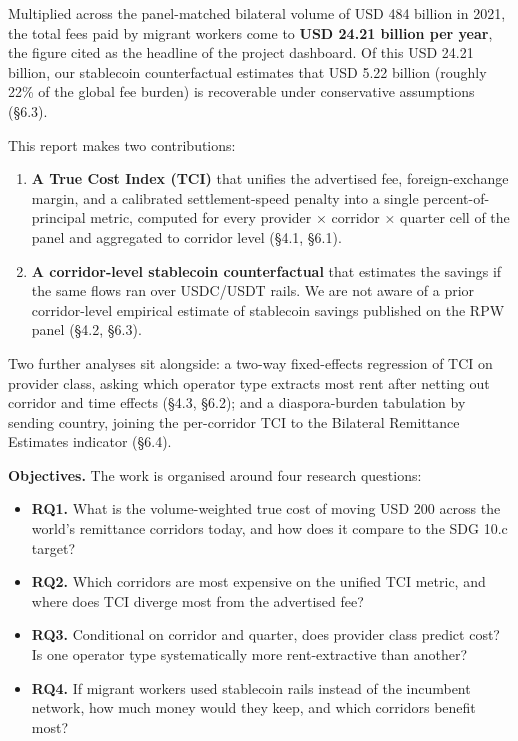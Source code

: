 \documentclass[
  11pt,
]{article}
\providecommand{\tightlist}{%
  \setlength{\itemsep}{0pt}\setlength{\parskip}{0pt}}
\begin{document}
Multiplied across the panel-matched bilateral volume of USD 484 billion
in 2021, the total fees paid by migrant workers come to \textbf{USD
24.21 billion per year}, the figure cited as the headline of the project
dashboard. Of this USD 24.21 billion, our stablecoin counterfactual
estimates that USD 5.22 billion (roughly 22\% of the global fee burden)
is recoverable under conservative assumptions (§6.3).

This report makes two contributions:

\begin{enumerate}
\def\labelenumi{\arabic{enumi}.}
\item
  \textbf{A True Cost Index (TCI)} that unifies the advertised fee,
  foreign-exchange margin, and a calibrated settlement-speed penalty
  into a single percent-of-principal metric, computed for every provider
  × corridor × quarter cell of the panel and aggregated to corridor
  level (§4.1, §6.1).
\item
  \textbf{A corridor-level stablecoin counterfactual} that estimates the
  savings if the same flows ran over USDC/USDT rails. We are not aware
  of a prior corridor-level empirical estimate of stablecoin savings
  published on the RPW panel (§4.2, §6.3).
\end{enumerate}

Two further analyses sit alongside: a two-way fixed-effects regression
of TCI on provider class, asking which operator type extracts most rent
after netting out corridor and time effects (§4.3, §6.2); and a
diaspora-burden tabulation by sending country, joining the per-corridor
TCI to the Bilateral Remittance Estimates indicator (§6.4).

\textbf{Objectives.} The work is organised around four research
questions:

\begin{itemize}
\tightlist
\item
  \textbf{RQ1.} What is the volume-weighted true cost of moving USD 200
  across the world's remittance corridors today, and how does it compare
  to the SDG 10.c target?
\item
  \textbf{RQ2.} Which corridors are most expensive on the unified TCI
  metric, and where does TCI diverge most from the advertised fee?
\item
  \textbf{RQ3.} Conditional on corridor and quarter, does provider class
  predict cost? Is one operator type systematically more rent-extractive
  than another?
\item
  \textbf{RQ4.} If migrant workers used stablecoin rails instead of the
  incumbent network, how much money would they keep, and which corridors
  benefit most?
\end{itemize}
\end{document}
